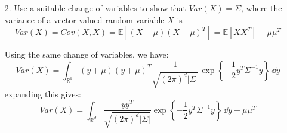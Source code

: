 \documentclass{article}
\begin{document}
\begin{itemize}
            \item [2.] Use a suitable change of variables to show that $Var(X) = \Sigma$, where the variance of a vector-valued random variable $X$ is
                \begin{equation*}
                    Var(X) = Cov(X, X) = \mathbb{E}[(X - \mu)(X - \mu)^{T}] = \mathbb{E}[XX^{T}] - \mu\mu^{T}
                \end{equation*}
                \begin{answer}
                    Using the same change of variables, we have:
                        \begin{equation*}
                            Var(X) = \int_{\mathbb{R}^{d}}^{} (y + \mu)(y + \mu)^{T}\dfrac{1}{\sqrt{(2\pi)^{d}\lvert \Sigma \rvert}}\exp\left\{-\dfrac{1}{2}y^{T}\Sigma^{-1}y\right\} \, \dd{y} 
                        \end{equation*}
                    expanding this gives:
                        \begin{equation*}
                            Var(X) = \int_{\mathbb{R}^{d}}^{} \dfrac{yy^{T}}{\sqrt{(2\pi)^{d}\lvert \Sigma \rvert}} \exp\left\{-\dfrac{1}{2}y^{T} \Sigma^{-1} y\right\} \, \dd{y}  + \mu\mu^{T}
                        \end{equation*}
                    
                \end{answer}


\end{itemize}
\end{document}

